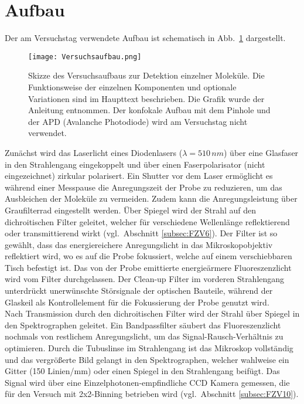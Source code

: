 \section{\label{sec:aufbau}Aufbau}
Der am Versuchstag verwendete Aufbau ist schematisch in Abb.~\ref{fig:aufbau} dargestellt. 
\begin{figure}[h!]
    \centering
    \texttt{[image: Versuchsaufbau.png]}
    \caption{\label{fig:aufbau}Skizze des Versuchsaufbaus zur Detektion einzelner Moleküle. 
    Die Funktionsweise der einzelnen Komponenten und optionale Variationen sind im Haupttext beschrieben.
    Die Grafik wurde der Anleitung \cite{Anleitung} entnommen.
    Der konfokale Aufbau mit dem Pinhole und der APD (Avalanche Photodiode)
    wird am Versuchstag nicht verwendet.}
\end{figure} \FloatBarrier
Zunächst wird das Laserlicht eines Diodenlasers ($\lambda = 510\,\si{nm}$) über eine Glasfaser 
in den Strahlengang eingekoppelt und über einen Faserpolarisator (nicht eingezeichnet) zirkular polarisert. 
Ein Shutter vor dem Laser ermöglicht es während einer Messpause die Anregungszeit der
Probe zu reduzieren, um das Ausbleichen der Moleküle zu vermeiden. Zudem kann die Anregungsleistung über Graufilterrad 
eingestellt werden. Über Spiegel wird der Strahl auf den dichroitischen Filter geleitet, welcher für verschiedene 
Wellenlänge reflektierend oder transmittierend wirkt (vgl.~Abschnitt \ref{subsec:FZV6}). Der Filter ist so gewählt,
dass das energiereichere Anregungslicht in das Mikroskopobjektiv reflektiert wird, wo es auf die Probe 
fokussiert, welche auf einem verschiebbaren Tisch befestigt ist. Das von der Probe emittierte energieärmere 
Fluoreszenzlicht wird vom Filter durchgelassen. 
Der Clean-up Filter im vorderen Strahlengang unterdrückt unerwünschte Störsignale der optischen Bauteile, während 
der Glaskeil als Kontrollelement für die Fokussierung der Probe genutzt wird. \\
Nach Transmission durch den dichroitischen Filter wird der Strahl über Spiegel in den Spektrographen geleitet. 
Ein Bandpassfilter säubert das Fluoreszenzlicht nochmals von restlichem Anregungslicht, um das Signal-Rausch-Verhältnis 
zu optimieren. Durch die Tubuslinse im Strahlengang ist das Mikroskop vollständig und das vergrößerte Bild 
gelangt in den Spektrographen, welcher wahlweise ein Gitter (150 Linien/mm) oder einen Spiegel in den Strahlengang 
beifügt. Das Signal wird über eine Einzelphotonen-empfindliche CCD Kamera gemessen, die für den Versuch mit 
2x2-Binning betrieben wird (vgl.~Abschnitt \ref{subsec:FZV10}). \\ 
